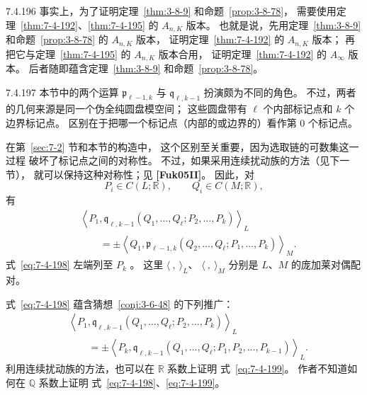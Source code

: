 \begin{remark}{7.4.196}\label{rem:7-4-196}
事实上，为了证明定理~\ref{thm:3-8-9}
和命题~\ref{prop:3-8-78}，
需要使用定理~\ref{thm:7-4-192}、\ref{thm:7-4-195}
的 $A_{n,K}$ 版本。
也就是说，先用定理~\ref{thm:3-8-9}
和命题~\ref{prop:3-8-78} 的 $A_{n,K}$ 版本，
证明定理~\ref{thm:7-4-192} 的 $A_{n,K}$ 版本；
再把它与定理~\ref{thm:7-4-195} 的 $A_{n,K}$ 版本合用，
证明定理~\ref{thm:7-4-192} 的 $A_\infty$ 版本。
后者随即蕴含定理~\ref{thm:3-8-9}
和命题~\ref{prop:3-8-78}。
\end{remark}

\begin{remark}{7.4.197}\label{rem:7-4-197}
本节中的两个运算
$\mathfrak p_{\ell-1,k}$ 与 $\mathfrak q_{\ell,k-1}$
扮演颇为不同的角色。
不过，两者的几何来源是同一个伪全纯圆盘模空间；
这些圆盘带有 $\ell$ 个内部标记点和 $k$ 个边界标记点。
区别在于把哪一个标记点（内部的或边界的）看作第 $0$ 个标记点。

在第~\ref{sec:7-2} 节和本节的构造中，
这个区别至关重要，因为选取链的可数集这一过程
破坏了标记点之间的对称性。
不过，如果采用连续扰动族的方法（见下一节），
就可以保持这种对称性；见 \textbf{[Fuk05II]}。
因此，对
\[
P_i\in C(L;\mathbb R),
\qquad
Q_i\in C(M;\mathbb R),
\]
有
\begin{equation}
\begin{aligned}
&\left\langle
P_1,
\mathfrak q_{\ell,k-1}
(Q_1,\ldots,Q_\ell;P_2,\ldots,P_k)
\right\rangle_L\\
&\qquad=
\pm\left\langle
Q_1,
\mathfrak p_{\ell-1,k}
(Q_2,\ldots,Q_\ell;P_1,\ldots,P_k)
\right\rangle_M.
\end{aligned}
\tag{7.4.198}\label{eq:7-4-198}
\end{equation}
式~\eqref{eq:7-4-198} 左端列至 $P_k$
。
这里 $\langle\ ,\ \rangle_L$、
$\langle\ ,\ \rangle_M$
分别是 $L$、$M$ 的庞加莱对偶配对。

式~\eqref{eq:7-4-198} 蕴含猜想~\ref{conj:3-6-48}
的下列推广：
\begin{equation}
\begin{aligned}
&\left\langle
P_1,
\mathfrak q_{\ell,k-1}
(Q_1,\ldots,Q_\ell;P_2,\ldots,P_k)
\right\rangle_L\\
&\qquad=
\pm\left\langle
P_k,
\mathfrak q_{\ell,k-1}
(Q_1,\ldots,Q_\ell;P_1,P_2,\ldots,P_{k-1})
\right\rangle_L.
\end{aligned}
\tag{7.4.199}\label{eq:7-4-199}
\end{equation}
利用连续扰动族的方法，也可以在 $\mathbb R$ 系数上证明
式~\eqref{eq:7-4-199}。
作者不知道如何在 $\mathbb Q$ 系数上证明
式~\eqref{eq:7-4-198}、\eqref{eq:7-4-199}。


\end{remark}

